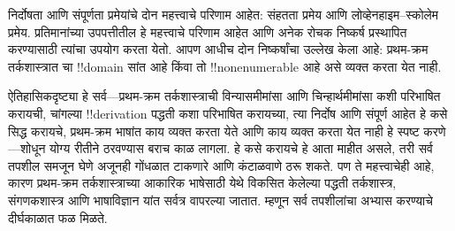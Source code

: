 \documentclass[../../../include/open-logic-section]{subfiles}
\begin{document}
निर्दोषता आणि संपूर्णता प्रमेयांचे दोन महत्त्वाचे परिणाम आहेत: संहतता
प्रमेय आणि लोव्हेनहाइम--स्कोलेम प्रमेय. प्रतिमानांच्या उपपत्तीतील हे
महत्त्वाचे परिणाम आहेत आणि अनेक रोचक निष्कर्ष प्रस्थापित करण्यासाठी
त्यांचा उपयोग करता येतो. आपण आधीच दोन निष्कर्षांचा उल्लेख केला आहे:
प्रथम-क्रम तर्कशास्त्रात चा !!{domain} सांत आहे किंवा तो
!!{nonenumerable} आहे असे व्यक्त करता येत नाही.

ऐतिहासिकदृष्ट्या हे सर्व---प्रथम-क्रम तर्कशास्त्राची विन्यासमीमांसा आणि
चिन्हार्थमीमांसा कशी परिभाषित करायची, चांगल्या !!{derivation} पद्धती
कशा परिभाषित करायच्या, त्या निर्दोष आणि संपूर्ण आहेत हे कसे सिद्ध
करायचे, प्रथम-क्रम भाषांत काय व्यक्त करता येते आणि काय व्यक्त करता येत
नाही हे स्पष्ट करणे---शोधून योग्य रीतीने ठरवण्यास बराच काळ लागला. हे
कसे करायचे हे आता माहीत असले, तरी सर्व तपशील समजून घेणे अजूनही
गोंधळात टाकणारे आणि कंटाळवाणे ठरू शकते. पण ते महत्त्वाचेही आहे, कारण
प्रथम-क्रम तर्कशास्त्राच्या आकारिक भाषेसाठी येथे विकसित केलेल्या पद्धती
तर्कशास्त्र, संगणकशास्त्र आणि भाषाविज्ञान यांत सर्वत्र वापरल्या जातात.
म्हणून सर्व तपशीलांचा अभ्यास करण्याचे दीर्घकाळात फळ मिळते.
\end{document}
